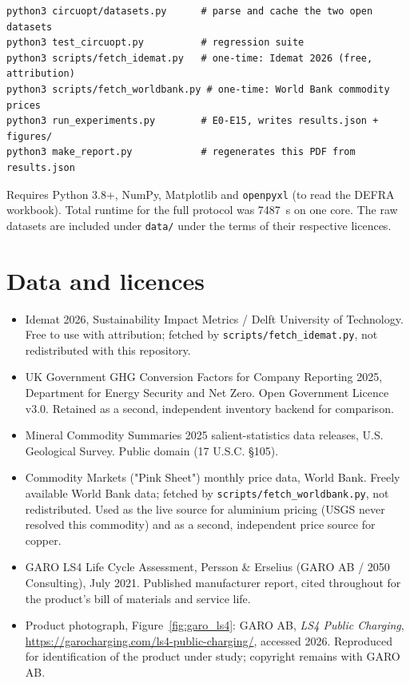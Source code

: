 \documentclass[11pt,a4paper]{article}
\begin{document}
\begin{verbatim}
python3 circuopt/datasets.py      # parse and cache the two open datasets
python3 test_circuopt.py          # regression suite
python3 scripts/fetch_idemat.py   # one-time: Idemat 2026 (free, attribution)
python3 scripts/fetch_worldbank.py # one-time: World Bank commodity prices
python3 run_experiments.py        # E0-E15, writes results.json + figures/
python3 make_report.py            # regenerates this PDF from results.json
\end{verbatim}

Requires Python 3.8+, NumPy, Matplotlib and \texttt{openpyxl} (to read the
DEFRA workbook). Total runtime for the full protocol was
\SI{7487}{\second} on one core. The raw datasets are
included under \texttt{data/} under the terms of their respective licences.

\section*{Data and licences}
\small
\begin{itemize}
\item Idemat 2026, Sustainability Impact Metrics / Delft University of
Technology. Free to use with attribution; fetched by
\texttt{scripts/fetch\_idemat.py}, not redistributed with this repository.
\item UK Government GHG Conversion Factors for Company Reporting 2025,
Department for Energy Security and Net Zero. Open Government Licence v3.0.
Retained as a second, independent inventory backend for comparison.
\item Mineral Commodity Summaries 2025 salient-statistics data releases,
U.S. Geological Survey. Public domain (17 U.S.C. \S 105).
\item Commodity Markets ("Pink Sheet") monthly price data, World Bank.
Freely available World Bank data; fetched by
\texttt{scripts/fetch\_worldbank.py}, not redistributed. Used as the live
source for aluminium pricing (USGS never resolved this commodity) and as a
second, independent price source for copper.
\item GARO LS4 Life Cycle Assessment, Persson \& Erselius (GARO AB / 2050
Consulting), July 2021. Published manufacturer report, cited throughout for
the product's bill of materials and service life.
\item Product photograph, Figure~\ref{fig:garo_ls4}: GARO AB, \emph{LS4 Public
Charging}, \url{https://garocharging.com/ls4-public-charging/}, accessed 2026.
Reproduced for identification of the product under study; copyright remains
with GARO AB.
\end{itemize}
\end{document}
